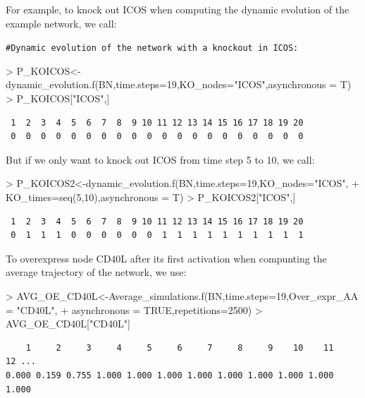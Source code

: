 \documentclass[a4paper]{article}
\begin{document}
For example, to knock out ICOS when computing the dynamic evolution of the example network, we call:
\begin{Schunk}
\end{Schunk}
\texttt{\#Dynamic evolution of the network with a knockout in ICOS:}
\begin{Schunk}
\begin{Sinput}
> P_KOICOS<-dynamic_evolution.f(BN,time.steps=19,KO_nodes="ICOS",asynchronous = T)
> P_KOICOS["ICOS",]
\end{Sinput}
\end{Schunk}
\begin{verbatim}
 1  2  3  4  5  6  7  8  9 10 11 12 13 14 15 16 17 18 19 20 
 0  0  0  0  0  0  0  0  0  0  0  0  0  0  0  0  0  0  0  0 
\end{verbatim}
But if we only want to knock out ICOS from time step 5 to 10, we call:
\begin{Schunk}
\begin{Sinput}
> P_KOICOS2<-dynamic_evolution.f(BN,time.steps=19,KO_nodes="ICOS",
+                                KO_times=seq(5,10),asynchronous = T)
> P_KOICOS2["ICOS",]
\end{Sinput}
\end{Schunk}
\begin{verbatim}
 1  2  3  4  5  6  7  8  9 10 11 12 13 14 15 16 17 18 19 20 
 0  1  1  1  0  0  0  0  0  0  1  1  1  1  1  1  1  1  1  1 
\end{verbatim}

To overexpress node CD40L after its first activation when compunting the average trajectory of the network, we use: 
\begin{Schunk}
\begin{Sinput}
> AVG_OE_CD40L<-Average_simulations.f(BN,time.steps=19,Over_expr_AA = "CD40L",
+                                    asynchronous = TRUE,repetitions=2500)
> AVG_OE_CD40L["CD40L"]
\end{Sinput}
\end{Schunk}
\begin{verbatim}
    1     2     3     4     5     6     7     8     9    10    11    12 ...
0.000 0.159 0.755 1.000 1.000 1.000 1.000 1.000 1.000 1.000 1.000 1.000
\end{verbatim}
\end{document}
